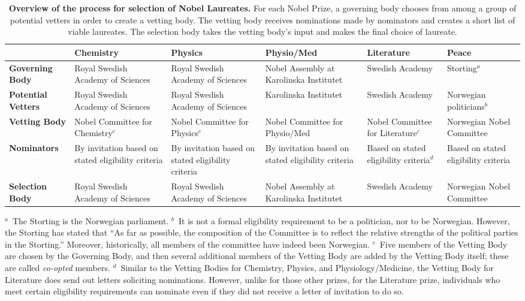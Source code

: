\documentclass[12pt]{article}
\begin{document}
\begin{table}
\centering
\caption{\textbf{Overview of the process for selection of Nobel Laureates.} For each Nobel Prize, a governing body chooses from among a group of potential vetters in order to create a vetting body. The vetting body receives nominations made by nominators and creates a short list of viable laureates. The selection body takes the vetting body's input and makes the final choice of laureate.}
\label{tab:selection_process}
\small
\begin{tabular}{p{}p{}p{}p{}p{}p{}}
\hline
& \textbf{Chemistry} & \textbf{Physics} & \textbf{Physio/Med} & \textbf{Literature} & \textbf{Peace} \\
\hline
\textbf{Governing Body} & Royal Swedish Academy of Sciences & Royal Swedish Academy of Sciences & Nobel Assembly at Karolinska Institutet & Swedish Academy & Storting$^{a}$ \\
\hline
\textbf{Potential Vetters} & Royal Swedish Academy of Sciences & Royal Swedish Academy of Sciences & Karolinska Institutet & Swedish Academy & Norwegian politicians$^{b}$ \\
\hline
\textbf{Vetting Body} & Nobel Committee for Chemistry$^{c}$ & Nobel Committee for Physics$^{c}$ & Nobel Committee for Physio/Med & Nobel Committee for Literature$^{c}$ & Norwegian Nobel Committee \\
\hline
\textbf{Nominators} & By invitation based on stated eligibility criteria & By invitation based on stated eligibility criteria & By invitation based on stated eligibility criteria & Based on stated eligibility criteria$^{d}$ & Based on stated eligibility criteria \\
\hline
\textbf{Selection Body} & Royal Swedish Academy of Sciences & Royal Swedish Academy of Sciences & Nobel Assembly at Karolinska Institutet & Swedish Academy & Norwegian Nobel Committee \\
\hline
\end{tabular}

\smallskip
{\noindent\scriptsize\linespread{1.0}\selectfont
$^{a}$~The Storting is the Norwegian parliament.
$^{b}$~It is not a formal eligibility requirement to be a politician, nor to be Norwegian. However, the Storting has stated that ``As far as possible, the composition of the Committee is to reflect the relative strengths of the political parties in the Storting.'' Moreover, historically, all members of the committee have indeed been Norwegian.
$^{c}$~Five members of the Vetting Body are chosen by the Governing Body, and then several additional members of the Vetting Body are added by the Vetting Body itself; these are called \emph{co-opted} members.
$^{d}$~Similar to the Vetting Bodies for Chemistry, Physics, and Physiology/Medicine, the Vetting Body for Literature does send out letters soliciting nominations. However, unlike for those other prizes, for the Literature prize, individuals who meet certain eligibility requirements can nominate even if they did not receive a letter of invitation to do so.
\par}
\end{table}
\end{document}
